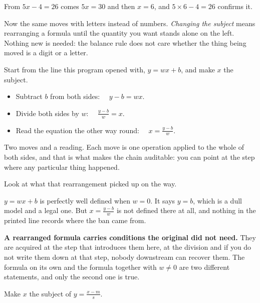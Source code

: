 \begin{fr}
From $5x - 4 = 26$ comes $5x = 30$ and then $x = 6$, and
$5 \times 6 - 4 = 26$ confirms it.

Now the same moves with letters instead of numbers. \emph{Changing the subject}
means rearranging a formula until the quantity you want stands alone on the
left. Nothing new is needed: the balance rule does not care whether the thing
being moved is a digit or a letter.

Start from the line this program opened with, $y = wx + b$, and make $x$ the
subject.

\begin{itemize}
\item Subtract $b$ from both sides: $\quad y - b = wx$.
\item Divide both sides by $w$: $\quad \frac{y - b}{w} = x$.
\item Read the equation the other way round:
  $\quad x = \frac{y - b}{w}$.
\end{itemize}

Two moves and a reading. Each move is one operation applied to the whole of
both sides, and that is what makes the chain auditable: you can point at the
step where any particular thing happened.
\end{fr}


\begin{fr}
Look at what that rearrangement picked up on the way.

$y = wx + b$ is perfectly well defined when $w = 0$. It says $y = b$, which is
a dull model and a legal one. But $x = \frac{y - b}{w}$ is not defined there
at all, and nothing in the printed line records where the ban came from.

\textbf{A rearranged formula carries conditions the original did not need.}
They are acquired at the step that introduces them \dash{} here, at the
division \dash{} and if you do not write them down at that step, nobody
downstream can recover them. The formula on its own and the formula together
with $w \ne 0$ are two different statements, and only the second one is true.

Make $x$ the subject of $y = \frac{x - m}{s}$.
\nextframe
\end{fr}

